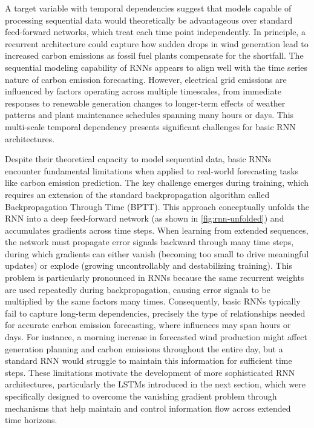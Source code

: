 A target variable with temporal dependencies suggest that models capable of processing sequential data would theoretically be advantageous over standard feed-forward networks, which treat each time point independently. In principle, a recurrent architecture could capture how sudden drops in wind generation lead to increased carbon emissions as fossil fuel plants compensate for the shortfall. The sequential modeling capability of RNNs appears to align well with the time series nature of carbon emission forecasting. However, electrical grid emissions are influenced by factors operating across multiple timescales, from immediate responses to renewable generation changes to longer-term effects of weather patterns and plant maintenance schedules spanning many hours or days. This multi-scale temporal dependency presents significant challenges for basic RNN architectures.

Despite their theoretical capacity to model sequential data, basic RNNs encounter fundamental limitations when applied to real-world forecasting tasks like carbon emission prediction. The key challenge emerges during training, which requires an extension of the standard backpropagation algorithm called Backpropagation Through Time (BPTT). This approach conceptually unfolds the RNN into a deep feed-forward network (as shown in \autoref{fig:rnn-unfolded}) and accumulates gradients across time steps. When learning from extended sequences, the network must propagate error signals backward through many time steps, during which gradients can either vanish (becoming too small to drive meaningful updates) or explode (growing uncontrollably and destabilizing training). This problem is particularly pronounced in RNNs because the same recurrent weights are used repeatedly during backpropagation, causing error signals to be multiplied by the same factors many times. Consequently, basic RNNs typically fail to capture long-term dependencies, precisely the type of relationships needed for accurate carbon emission forecasting, where influences may span hours or days. For instance, a morning increase in forecasted wind production might affect generation planning and carbon emissions throughout the entire day, but a standard RNN would struggle to maintain this information for sufficient time steps. These limitations motivate the development of more sophisticated RNN architectures, particularly the LSTMs introduced in the next section, which were specifically designed to overcome the vanishing gradient problem through mechanisms that help maintain and control information flow across extended time horizons.

